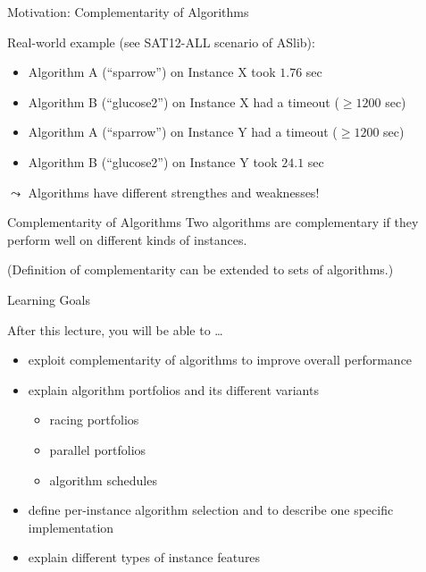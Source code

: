 \begin{frame}[c]{Motivation: Complementarity of Algorithms}

Real-world example (see SAT12-ALL scenario of ASlib):

\begin{itemize}
  \item Algorithm A (``sparrow'') on Instance X took $1.76$ sec
  \item Algorithm B (``glucose2'') on Instance X had a timeout ($\geq 1200$ sec)
  \pause
  \medskip
  \item Algorithm A (``sparrow'') on Instance Y had a timeout ($\geq 1200$ sec)
  \item Algorithm B (``glucose2'') on Instance Y took $24.1$ sec
\end{itemize}

\pause
$\leadsto$ Algorithms have different strengthes and weaknesses!

\pause
\bigskip
\begin{block}{Complementarity of Algorithms}
Two algorithms are complementary if they perform well on different kinds of instances.
\end{block}

\pause
(Definition of complementarity can be extended to sets of algorithms.)


\end{frame}
\begin{frame}[c]{Learning Goals}

After this lecture, you will be able to \ldots

\begin{itemize}
  \item \alert{exploit complementarity} of algorithms to improve overall performance
  \item explain \alert{algorithm portfolios} and its different variants
  \begin{itemize}
    \item racing portfolios
    \item parallel portfolios
    \item algorithm schedules
  \end{itemize}
  \item define \alert{per-instance algorithm selection} and to describe one specific implementation 
  \item explain different types of \alert{instance features}
\end{itemize}

\end{frame}
